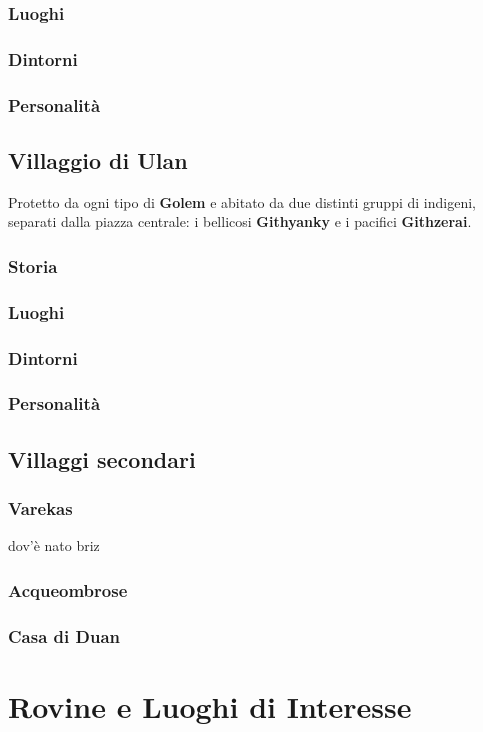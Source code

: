 \documentclass[10pt,twoside,onecolumn,openany]{book}
\begin{document}
\subsubsection{Luoghi}
\subsubsection{Dintorni}
\subsubsection{Personalità}
\newpage
\subsection{Villaggio di Ulan}
Protetto da ogni tipo di \textbf{Golem} e abitato da due distinti gruppi di indigeni, separati dalla piazza centrale: i bellicosi \textbf{Githyanky} e i pacifici \textbf{Githzerai}.
\subsubsection{Storia}
\subsubsection{Luoghi}
\subsubsection{Dintorni}
\subsubsection{Personalità}
\newpage
\subsection{Villaggi secondari}
\subsubsection{Varekas}dov'è nato briz
\subsubsection{Acqueombrose}
\subsubsection{Casa di Duan}
\newpage
\section{Rovine e Luoghi di Interesse}
\end{document}
